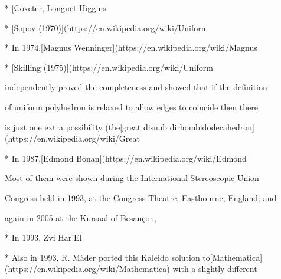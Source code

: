 * [Coxeter, Longuet-Higgins %

* [Sopov (1970)](https://en.wikipedia.org/wiki/Uniform%

* In 1974,[Magnus Wenninger](https://en.wikipedia.org/wiki/Magnus%

* [Skilling (1975)](https://en.wikipedia.org/wiki/Uniform%

independently proved the completeness and showed that if the definition

of uniform polyhedron is relaxed to allow edges to coincide then there

is just one extra possibility (the[great disnub dirhombidodecahedron](https://en.wikipedia.org/wiki/Great%

* In 1987,[Edmond Bonan](https://en.wikipedia.org/wiki/Edmond%

Most of them were shown during the International Stereoscopic Union

Congress held in 1993, at the Congress Theatre, Eastbourne, England; and

again in 2005 at the Kursaal of Besançon, %

* In 1993, Zvi Har'El %

* Also in 1993, R. Mäder ported this Kaleido solution to[Mathematica](https://en.wikipedia.org/wiki/Mathematica) with a slightly different %

